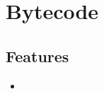 \section{Bytecode}
\label{module:Bytecode}

\subsection{Features}
\begin{itemize}
	\item {}
\end{itemize}